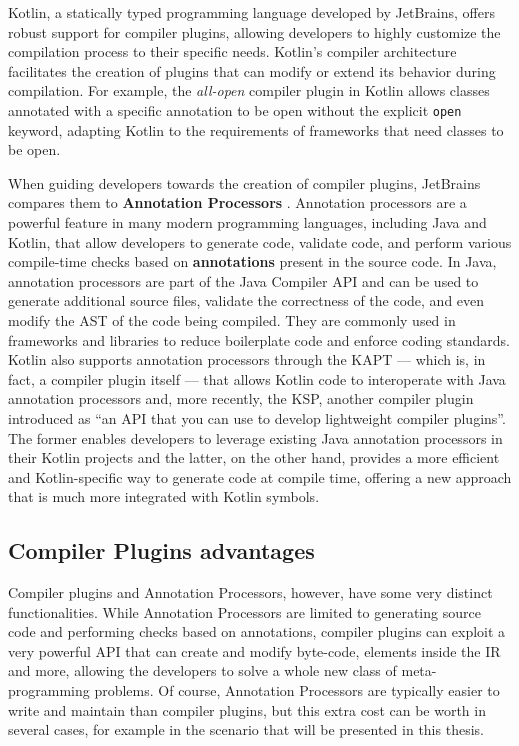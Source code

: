 \documentclass[12pt,a4paper,openright,twoside]{book}
\begin{document}
Kotlin, a statically typed programming language developed by JetBrains, offers
robust support for compiler plugins, allowing developers to highly customize the
compilation process to their specific needs. 
%
Kotlin's compiler architecture facilitates the creation of plugins that can
modify or extend its behavior during compilation. For example, the
\emph{all-open} compiler plugin in Kotlin allows classes annotated with a
specific annotation to be open without the explicit \lstinline{open} keyword,
adapting Kotlin to the requirements of frameworks that need classes to be
open. 

When guiding developers towards the creation of compiler plugins, JetBrains
compares them to \textbf{Annotation Processors}
\cite{JetBrains:KotlinCompilerPlugin}. Annotation processors are a powerful
feature in many modern programming languages, including Java and Kotlin, that
allow developers to generate code, validate code, and perform various
compile-time checks based on \textbf{annotations} present in the source code.
%
In Java, annotation processors are part of the Java Compiler API and can be used
to generate additional source files, validate the correctness of the code, and
even modify the \ac{AST} of the code being compiled. They are
commonly used in frameworks and libraries to reduce boilerplate code and enforce
coding standards.
%
Kotlin also supports annotation processors through the \ac{KAPT} — which is, in
fact, a compiler plugin itself — that allows Kotlin code to interoperate with
Java annotation processors and, more recently, the \ac{KSP}, another compiler
plugin introduced as ``an API that you can use to develop lightweight compiler
plugins''. The former enables developers to leverage existing Java annotation
processors in their Kotlin projects and the latter, on the other hand, provides
a more efficient and Kotlin-specific way to generate code at compile time,
offering a new approach that is much more integrated with Kotlin symbols.

\subsection{Compiler Plugins advantages}

Compiler plugins and Annotation Processors, however, have some very distinct
functionalities. While Annotation Processors are limited to generating source
code and performing checks based on annotations, compiler plugins can exploit a
very powerful API that can create and modify byte-code, elements inside the
\ac{IR} and more, allowing the developers to solve a whole new class of
meta-programming problems. Of course, Annotation Processors are typically easier
to write and maintain than compiler plugins, but this extra cost can be worth in
several cases, for example in the scenario that will be presented in this
thesis.
\end{document}
